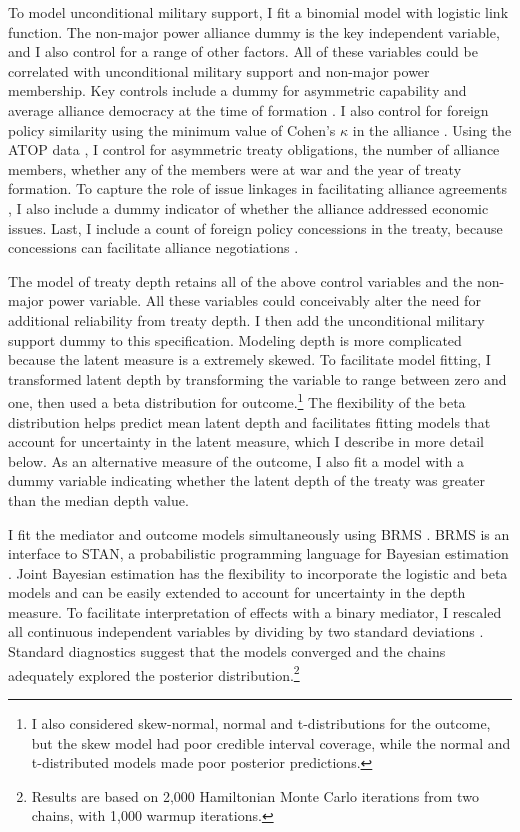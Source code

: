 \documentclass[12pt]{article}
\begin{document}
To model unconditional military support, I fit a binomial model with logistic link function. 
The non-major power alliance dummy is the key independent variable, and I also control for a range of other factors.
All of these variables could be correlated with unconditional military support and non-major power membership. 
Key controls include a dummy for asymmetric capability \citep{Mattes2012} and average alliance democracy at the time of formation \citep{Chibaetal2015}. 
I also control for foreign policy similarity \citep{Benson2012} using the minimum value of Cohen's $\kappa$ in the alliance \citep{Hage2011}.
Using the ATOP data \citep{Leedsetal2002}, I control for asymmetric treaty obligations, the number of alliance members, whether any of the members were at war and the year of treaty formation. 
To capture the role of issue linkages in facilitating alliance agreements \citep{Poast2012, Poast2013}, I also include a dummy indicator of whether the alliance addressed economic issues.  
Last, I include a count of foreign policy concessions in the treaty, because concessions can facilitate alliance negotiations \citep{Johnson2015}. 


The model of treaty depth retains all of the above control variables and the non-major power variable. 
All these variables could conceivably alter the need for additional reliability from treaty depth. 
I then add the unconditional military support dummy to this specification. 
Modeling depth is more complicated because the latent measure is a extremely skewed.
To facilitate model fitting, I transformed latent depth by transforming the variable to range between zero and one, then used a beta distribution for outcome.\footnote{I also considered skew-normal, normal and t-distributions for the outcome, but the skew model had poor credible interval coverage, while the normal and t-distributed models made poor posterior predictions.}
The flexibility of the beta distribution helps predict mean latent depth and facilitates fitting models that account for uncertainty in the latent measure, which I describe in more detail below. 
As an alternative measure of the outcome, I also fit a model with a dummy variable indicating whether the latent depth of the treaty was greater than the median depth value. 


I fit the mediator and outcome models simultaneously using BRMS \citep{Buerkner2017}. 
BRMS is an interface to STAN, a probabilistic programming language for Bayesian estimation \citep{Carpenteretal2016}.
Joint Bayesian estimation has the flexibility to incorporate the logistic and beta models and can be easily extended to account for uncertainty in the depth measure. 
To facilitate interpretation of effects with a binary mediator, I rescaled all continuous independent variables by dividing by two standard deviations \citep{Gelman2008}. 
Standard diagnostics suggest that the models converged and the chains adequately explored the posterior distribution.\footnote{Results are based on 2,000 Hamiltonian Monte Carlo iterations from two chains, with 1,000 warmup iterations.} 
\end{document}
